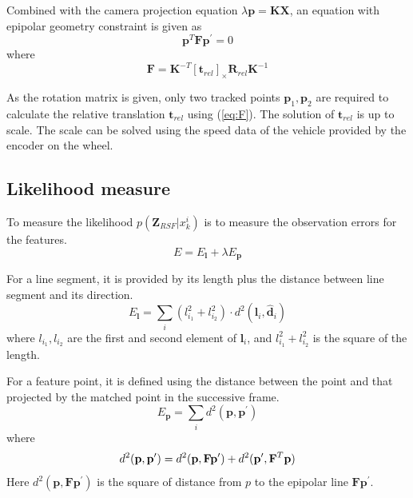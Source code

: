 \documentclass[letterpaper, 10 pt, conference]{ieeeconf}  %
\begin{document}
Combined with the camera projection equation $\lambda \mathbf{p}=\mathbf{K}\mathbf{X}$, an equation with epipolar geometry constraint is given as
\begin{equation}
\mathbf{p}^T \mathbf{F} \mathbf{p}^\prime=0
\end{equation}
where
\begin{equation}
\mathbf{F} = \mathbf{K}^{-T} {\left[\mathbf{t}_{rel}\right]}_\times \mathbf{R}_{rel} \mathbf{K}^{-1}
\label{eq:F}
\end{equation}

As the rotation matrix is given, only two tracked points $\mathbf{p}_1,\mathbf{p}_2$ are required to calculate the relative translation $\mathbf{t}_{rel}$ using (\ref{eq:F}). The solution of $\mathbf{t}_{rel}$ is up to scale. The scale can be solved using the speed data of the vehicle provided by the encoder on the wheel.

\subsection{Likelihood measure}
To measure the likelihood $p(\mathbf{Z}_{RSF} | x_k^i)$ is to measure the observation errors for the features.
\begin{equation}
E= E_\mathbf{l} + \lambda E_\mathbf{p}
\end{equation}

For a line segment, it is provided by its length plus the distance between line segment and its direction.
\begin{equation}
E_\mathbf{l} = \sum_{i} \left(l_{i_1}^2+l_{i_2}^2\right) \cdot d^2(\mathbf{l}_i,\hat{\mathbf{d}}_i)
\end{equation}
where $l_{i_1},l_{i_2}$ are the first and second element of $\mathbf{l}_i$, and $l_{i_1}^2+l_{i_2}^2$ is the square of the length.

For a feature point, it is defined using the distance between the point and that projected by the matched point in the successive frame.
\begin{equation}
E_\mathbf{p} = \sum_{i} d^2(\mathbf{p}, \mathbf{p}^\prime)
\end{equation}
where
\begin{equation}
d^2(\mathbf{p}, \mathbf{p}^\prime)
= d^2 (\mathbf{p}, \mathbf{F} \mathbf{p}^\prime)
+ d^2 (\mathbf{p}^\prime, \mathbf{F}^T\mathbf{p}) \\
\end{equation}
Here $d^2 (\mathbf{p}, \mathbf{F} \mathbf{p}^\prime)$ is the square of distance from $p$ to the epipolar line $\mathbf{F} \mathbf{p}^\prime$.
\end{document}
